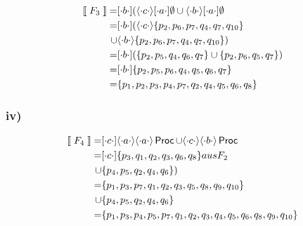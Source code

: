 \begin{align*}
\left \llbracket \; F_3 \; \right \rrbracket
	=& [ \cdot b \cdot ] (\langle \cdot c \cdot \rangle[ \cdot a \cdot ] \emptyset \cup \langle \cdot b \cdot \rangle[ \cdot a \cdot ] \emptyset\\
	=& [ \cdot b \cdot ] (\langle \cdot c \cdot \rangle\{p_2,p_6,p_7,q_4,q_7,q_{10}\} \\
	\cup& \langle \cdot b \cdot \rangle\{p_2,p_6,p_7,q_4,q_7,q_{10}\})\\
	=& [ \cdot b \cdot ] (\{p_2,p_5,q_4,q_6,q_7\} \cup \{p_2,p_6,q_5,q_7\})\\
	=& [ \cdot b \cdot ] \{p_2,p_5,p_6,q_4,q_5,q_6,q_7\}\\
	=& \{p_1,p_2,p_3,p_4,p_7,q_2,q_4,q_5,q_6,q_8\}
\end{align*}

\subsubsection*{iv)}

\begin{align*}
\left \llbracket \; F_4 \; \right \rrbracket
	=& [ \cdot c \cdot ] \langle \cdot a \cdot \rangle\langle \cdot a \cdot \rangle\operatorname{\sf Proc} \cup \langle \cdot c \cdot \rangle\langle \cdot b \cdot \rangle\operatorname{\sf Proc}\\
	=& [ \cdot c \cdot ] \{p_3,q_1,q_2,q_3,q_6,q_8\} \small{aus F_2} \\
	\cup& \{p_4,p_5,q_2,q_4,q_6\})\\
	=& \{p_1,p_3,p_7,q_1,q_2,q_3,q_5,q_8,q_9,q_{10}\}\\
	\cup& \{p_4,p_5,q_2,q_4,q_6\}\\
	=& \{p_1,p_3,p_4,p_5,p_7,q_1,q_2,q_3,q_4,q_5,q_6,q_8,q_9,q_{10}\}
\end{align*}
